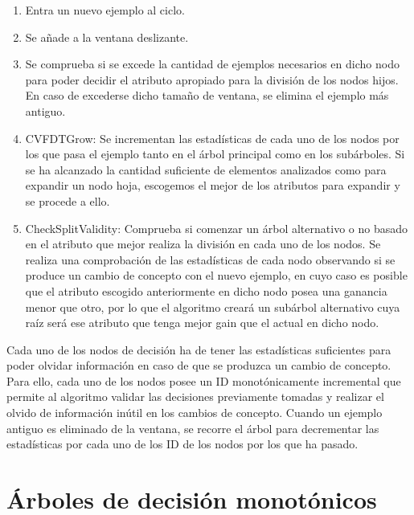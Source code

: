 \begin{enumerate}
	\item Entra un nuevo ejemplo al ciclo.
	\item Se añade a la ventana deslizante.
	\item Se comprueba si se excede la cantidad de ejemplos necesarios en dicho nodo para poder decidir el atributo apropiado para la división de los nodos hijos. En caso de excederse dicho tamaño de ventana, se elimina el ejemplo más antiguo.
	\item CVFDTGrow: Se incrementan las estadísticas de cada uno de los nodos por los que pasa el ejemplo tanto en el árbol principal como en los subárboles. Si se ha alcanzado la cantidad suficiente de elementos analizados como para expandir un nodo hoja, escogemos el mejor de los atributos para expandir y se procede a ello.
	\item CheckSplitValidity: Comprueba si comenzar un árbol alternativo o no basado en el atributo que mejor realiza la división en cada uno de los nodos. Se realiza una comprobación de las estadísticas de cada nodo observando si se produce un cambio de concepto con el nuevo ejemplo, en cuyo caso es posible que el atributo escogido anteriormente en dicho nodo posea una ganancia menor que otro, por lo que el algoritmo creará un subárbol alternativo cuya raíz será ese atributo que tenga mejor gain que el actual en dicho nodo.
\end{enumerate}

Cada uno de los nodos de decisión ha de tener las estadísticas suficientes para poder olvidar información en caso de que se produzca un cambio de concepto. Para ello, cada uno de los nodos posee un ID monotónicamente incremental que permite al algoritmo validar las decisiones previamente tomadas y realizar el olvido de información inútil en los cambios de concepto. Cuando un ejemplo antiguo es eliminado de la ventana, se recorre el árbol para decrementar las estadísticas por cada uno de los ID de los nodos por los que ha pasado.

\section{Árboles de decisión monotónicos}


\newpage


